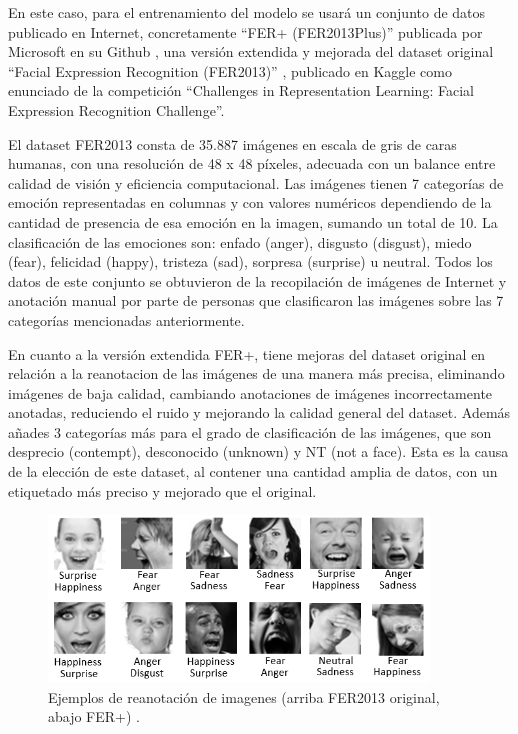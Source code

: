 \documentclass[12pt]{report} %
\begin{document}
En este caso, para el entrenamiento del modelo se usará un conjunto de datos publicado en Internet, concretamente “FER+ (FER2013Plus)” \cite{fer2013Plus} publicada por Microsoft en su Github \cite{fer2013PlusMicrosoft}, una versión extendida y mejorada del dataset original “Facial Expression Recognition (FER2013)” \cite{fer2013}, publicado en Kaggle como enunciado de la competición “Challenges in Representation Learning: Facial Expression Recognition Challenge”.

El dataset FER2013 consta de 35.887 imágenes en escala de gris de caras humanas, con una resolución de 48 x 48 píxeles, adecuada con un balance entre calidad de visión y eficiencia computacional. Las imágenes tienen 7 categorías de emoción representadas en columnas y con valores numéricos dependiendo de la cantidad de presencia de esa emoción en la imagen, sumando un total de 10. La clasificación de las emociones son: enfado (anger), disgusto (disgust), miedo (fear), felicidad (happy), tristeza (sad), sorpresa (surprise) u neutral. Todos los datos de este conjunto se obtuvieron de la recopilación de imágenes de Internet y anotación manual por parte de personas que clasificaron las imágenes sobre las 7 categorías mencionadas anteriormente.

En cuanto a la versión extendida FER+, tiene mejoras del dataset original en relación a la reanotacion de las imágenes de una manera más precisa, eliminando imágenes de baja calidad, cambiando anotaciones de imágenes incorrectamente anotadas, reduciendo el ruido y mejorando la calidad general del dataset. Además añades 3 categorías más para el grado de clasificación de las imágenes, que son desprecio (contempt), desconocido (unknown) y NT (not a face). Esta es la causa de la elección de este dataset, al contener una cantidad amplia de datos, con un etiquetado más preciso y mejorado que el original.

\begin{figure}[H]
	\centering
	\includegraphics[width=0.9\textwidth]{FER+vsFER.png}
	\caption{Ejemplos de reanotación de imagenes (arriba FER2013 original, abajo FER+) \cite{fer2013PlusMicrosoft}.}
	\label{fig:imagen29}
\end{figure}
\end{document}
